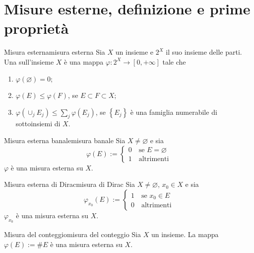 \section{Misure esterne, definizione e prime proprietà}

\begin{definition}{Misura esterna}{misura esterna}
    Sia $X$ un insieme e $2^X$ il suo insieme delle parti.\\
    Una  sull'insieme $X$ è una mappa $\varphi: 2^X \rightarrow[0,+\infty]$ tale che
    \begin{enumerate}
        \item $\varphi(\varnothing)=0$;
        \item $\varphi(E) \leq \varphi(F)$, se $E \subset F \subset X$;
        \item $\varphi\left(\cup_{j} E_{j}\right) \leq \sum_{j} \varphi\left(E_{j}\right)$, se $\left\{E_{j}\right\}$ è una famiglia numerabile di sottoinsiemi di $X$.
    \end{enumerate}
\end{definition}

\begin{example}{Misura esterna banale}{misura banale}
    Sia $X \neq \varnothing$ e sia \[\varphi(E) := \begin{cases} 
        0 \quad \text{se } E=\varnothing\\
        1 \quad \text{altrimenti}
    \end{cases}\] $\varphi$ è una misura esterna su $X$.
\end{example}
\begin{example}{Misura esterna di Dirac}{misura di Dirac}
    Sia $X \neq \varnothing$, $x_0 \in X$ e sia \[\varphi_{x_0}(E) := \begin{cases} 
        1 \quad \text{se } x_0 \in E\\
        0 \quad \text{altrimenti}
    \end{cases}\] $\varphi_{x_0}$ è una misura esterna su $X$.
\end{example}
\begin{example}{Misura del conteggio}{misura del conteggio}
    Sia $X$ un insieme. La mappa $\varphi(E):= \# E$ è una misura esterna su $X$.
\end{example}


